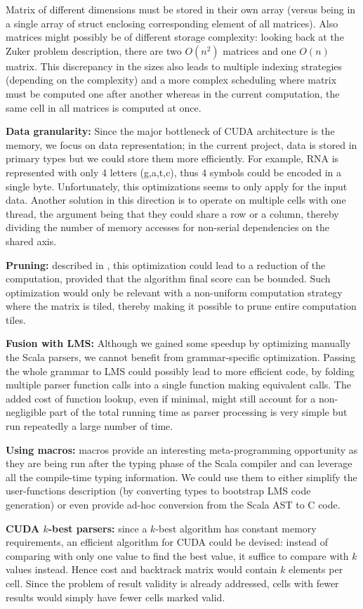 Matrix of different dimensions must be stored in their own array (versus being in a single array of struct enclosing corresponding element of all matrices). Also matrices might possibly be of different storage complexity: looking back at the Zuker problem description, there are two $O(n^2)$ matrices and one $O(n)$ matrix. This discrepancy in the sizes also leads to multiple indexing strategies (depending on the complexity) and a more complex scheduling where matrix must be computed one after another whereas in the current computation, the same cell in all matrices is computed at once.
\item \textbf{Data granularity:} Since the major bottleneck of CUDA architecture is the memory, we focus on data representation; in the current project, data is stored in primary types but we could store them more efficiently. For example, RNA is represented with only 4 letters (g,a,t,c), thus 4 symbols could be encoded in a single byte. Unfortunately, this optimizations seems to only apply for the input data. Another solution in this direction is to operate on multiple cells with one thread, the argument being that they could share a row or a column, thereby dividing the number of memory accesses for non-serial dependencies on the shared axis.
\item \textbf{Pruning:} described in \cite{swat_mega}, this optimization could lead to a reduction of the computation, provided that the algorithm final score can be bounded. Such optimization would only be relevant with a non-uniform computation strategy where the matrix is tiled, thereby making it possible to prune entire computation tiles.
\item \textbf{Fusion with LMS:} Although we gained some speedup by optimizing manually the Scala parsers, we cannot benefit from grammar-specific optimization. Passing the whole grammar to LMS could possibly lead to more efficient code, by folding multiple parser function calls into a single function making equivalent calls. The added cost of function lookup, even if minimal, might still account for a non-negligible part of the total running time as parser processing is very simple but run repeatedly a large number of time.
\item \textbf{Using macros:} macros provide an interesting meta-programming opportunity as they are being run after the typing phase of the Scala compiler and can leverage all the compile-time typing information. We could use them to either simplify the user-functions description (by converting types to bootstrap LMS code generation) or even provide ad-hoc conversion from the Scala AST to C code.
\item \textbf{CUDA $k$-best parsers:} since a $k$-best algorithm has constant memory requirements, an efficient algorithm for CUDA could be devised: instead of comparing with only one value to find the best value, it suffice to compare with $k$ values instead. Hence cost and backtrack matrix would contain $k$ elements per cell. Since the problem of result validity is already addressed, cells with fewer results would simply have fewer cells marked valid.
\ole

